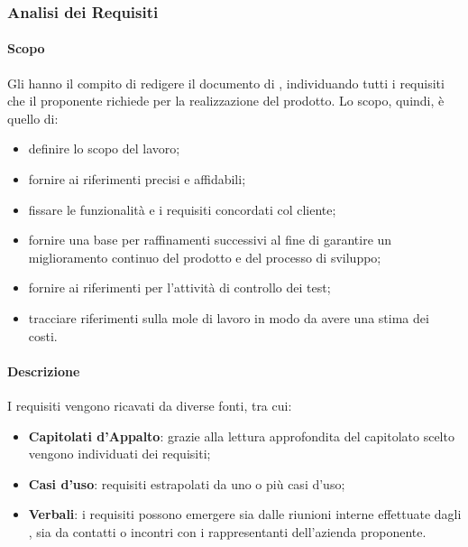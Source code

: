 \subsubsection{Analisi dei Requisiti}

\paragraph{Scopo}

Gli \anas{} hanno il compito di redigere il documento di \AdR{}, individuando tutti i requisiti che il proponente richiede per la realizzazione del prodotto.  Lo scopo,  quindi,  è quello di:
\begin{itemize}

\item definire lo scopo del lavoro;

\item fornire ai \progs{} riferimenti precisi e affidabili;

\item fissare le funzionalità e i requisiti concordati col cliente;

\item fornire una base per raffinamenti successivi al fine di garantire un miglioramento continuo del prodotto e del processo di sviluppo;

\item fornire ai \vers{} riferimenti per l'attività di controllo dei test;

\item tracciare riferimenti sulla mole di lavoro in modo da avere una stima dei costi.

\end{itemize}

\paragraph{Descrizione}

I requisiti vengono ricavati da diverse fonti,  tra cui:
\begin{itemize}

\item \textbf{Capitolati d'Appalto}: grazie alla lettura approfondita del capitolato scelto vengono individuati dei requisiti;

\item \textbf{Casi d'uso}: requisiti estrapolati da uno o più casi d'uso; 

\item \textbf{Verbali}: i requisiti possono emergere sia dalle riunioni interne effettuate dagli \anas{}, sia da contatti o incontri con i rappresentanti dell'azienda proponente.

\end{itemize}

